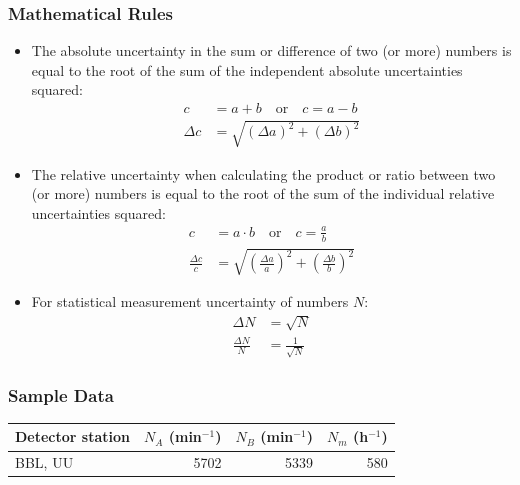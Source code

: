 \documentclass[12pt,a4paper]{article}
\numberwithin{equation}{section}
\numberwithin{figure}{section}
\numberwithin{table}{section}
\begin{document}
\begin{shaded}
\subsubsection*{Mathematical Rules}
\begin{itemize}
\item The absolute uncertainty in the sum or difference of two (or more) numbers is equal to the root of the sum of the independent absolute uncertainties squared:
\begin{align*}
c &= a + b \quad \text{or} \quad c = a - b \\
\Delta c &= \sqrt{(\Delta a)^2 + (\Delta b)^2}
\end{align*}
\item The relative uncertainty when calculating the product or ratio between two (or more) numbers is equal to the root of the sum of the individual relative uncertainties squared:
\begin{align*}
c &= a \cdot b \quad \text{or} \quad c = \frac{a}{b} \\
\frac{\Delta c}{c} &= \sqrt{\left( \frac{\Delta a}{a}\right) ^2 + \left( \frac{\Delta b}{b}\right) ^2}
\end{align*}
\item For statistical measurement uncertainty of numbers $N$:
\begin{align*}
\Delta N &= \sqrt{N} \\
\frac{\Delta N}{N} &= \frac{1}{\sqrt{N}}
\end{align*}
\end{itemize}
\end{shaded}

\begin{shaded}
\subsubsection*{Sample Data}

\begin{tabular}[h] {l r r r}
Detector station & $N_A$ (min$^{-1}$) & $N_B$ (min$^{-1}$) & $N_m$ (h$^{-1}$) \\ \hline
BBL, UU & 5702 & 5339 & 580\\
\end{tabular}
\label{tab:data_1}
\end{shaded}
\end{document}
